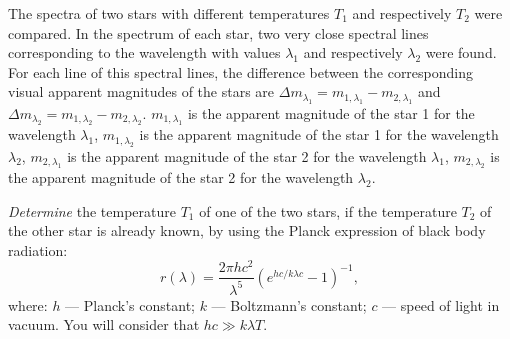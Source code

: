 The spectra of two stars with different temperatures $T_1$ and respectively
$T_2$ were compared. In the spectrum of each star, two very close spectral
lines corresponding to the wavelength with values $\lambda_1$ and respectively
$\lambda_2$ were found. For each line of this spectral lines, the difference
between the corresponding visual apparent magnitudes of the stars are
$\Delta m_{\lambda_1} = m_{1,\lambda_1} - m_{2,\lambda_1}$ and
$\Delta m_{\lambda_2} = m_{1,\lambda_2} - m_{2,\lambda_2}$.
$m_{1,\lambda_1}$ is the apparent magnitude of the star 1 for the wavelength
$\lambda_1$, $m_{1,\lambda_2}$ is the apparent magnitude of the star 1 for the
wavelength $\lambda_2$, $m_{2,\lambda_1}$ is the apparent magnitude of the
star 2 for the wavelength $\lambda_1$, $m_{2,\lambda_2}$ is the apparent
magnitude of the star 2 for the wavelength $\lambda_2$.

\emph{Determine} the temperature $T_1$ of one of the two stars, if the
temperature $T_2$ of the other star is already known, by using the Planck
expression of black body radiation:
\[ r(\lambda) = \frac{2\pi h c^2}{\lambda^5}
   \left( e^{hc/k\lambda c} - 1 \right)^{-1}, \]
where: $h$ --- Planck's constant; $k$ --- Boltzmann's constant; $c$ --- speed
of light in vacuum. You will consider that $hc \gg k\lambda T$.
